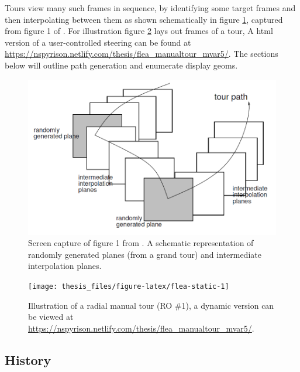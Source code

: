 \documentclass{monashthesis}
\begin{document}
Tours view many such frames in sequence, by identifying some target
frames and then interpolating between them as shown schematically in
figure \ref{fig:buja05fig}, captured from figure 1 of
\textcite{buja_computational_2005}. For illustration figure
\ref{fig:flea-static} lays out frames of a tour, A html version of a
user-controlled steering can be found at
\url{https://nspyrison.netlify.com/thesis/flea_manualtour_mvar5/}. The
sections below will outline path generation and enumerate display geoms.






\begin{figure}

{\centering \includegraphics[width=0.7\linewidth]{./figures/buja05fig} 

}

\caption{Screen capture of figure 1 from
\textcite{buja_computational_2005}. A schematic representation of
randomly generated planes (from a grand tour) and intermediate
interpolation planes.}\label{fig:buja05fig}
\end{figure}





\begin{figure}

{\centering \texttt{[image: thesis\_files/figure-latex/flea-static-1]} 

}

\caption{Illustration of a radial manual tour (RO \#1), a
dynamic version can be viewed at
\url{https://nspyrison.netlify.com/thesis/flea_manualtour_mvar5/}.}\label{fig:flea-static}
\end{figure}

\subsection{History}\label{history}
\end{document}
